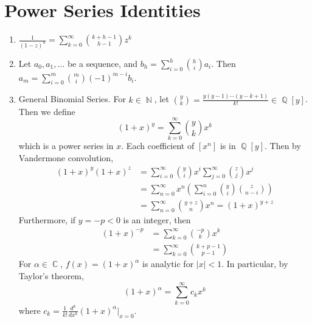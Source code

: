 \documentclass[11pt, a4paper]{memoir}
\DeclareMathOperator{\N}{{\mathbb{N}}}
\DeclareMathOperator{\Q}{{\mathbb{Q}}}
\DeclareMathOperator{\C}{{\mathbb{C}}}
\theoremstyle{change}
\theoremstyle{plain}
\theoremstyle{nonumberplain}
\numberwithin{equation}{section}
\begin{document}
\chapter{Power Series Identities}
\begin{enumerate}[nl,r]
    \item $\displaystyle\frac{1}{(1-z)^h}=\sum_{k=0}^\infty\binom{k+h-1}{h-1}z^k$
    \item Let $a_0,a_1,\ldots$ be a sequence, and $b_h=\sum_{i=0}^h\binom{h}{i}a_i$.
        Then $a_m=\sum_{i=0}^m\binom{m}{i}(-1)^{m-i}b_i$.
    \item General Binomial Series.
        For $k\in\N$, let $\binom{y}{k}=\frac{y(y-1)\cdots(y-k+1)}{k!}\in\Q[y]$.
        Then we define
        \begin{equation*}
            (1+x)^y=\sum_{k=0}^\infty\binom{y}{k}x^k
        \end{equation*}
        which is a power series in $x$.
        Each coefficient of $[x^n]$ is in $\Q[y]$.
        Then by Vandermone convolution,
        \begin{align*}
            (1+x)^y(1+x)^z&=\sum_{i=0}^\infty\binom{y}{i}x^i\sum_{j=0}^\infty\binom{z}{j}x^j\\
                          &=\sum_{n=0}^\infty x^n\left(\sum_{i=0}^n\binom{y}{i}\binom{z}{n-i}\right)\\
                          &= \sum_{n=0}^\infty\binom{y+z}{n}x^n=(1+x)^{y+z}
        \end{align*}
        Furthermore, if $y=-p<0$ is an integer, then
        \begin{align*}
            (1+x)^{-p}&=\sum_{k=0}^\infty\binom{-p}{k}x^k\\
                      &=\sum_{k=0}^\infty\binom{k+p-1}{p-1}
        \end{align*}
        For $\alpha\in\C$, $f(x)=(1+x)^\alpha$ is analytic for $|x|<1$.
        In particular, by Taylor's theorem,
        \begin{equation*}
            (1+x)^\alpha=\sum_{k=0}^\infty c_kx^k
        \end{equation*}
        where $c_k=\frac{1}{k!}\frac{d^k}{dx^k}(1+x)^\alpha|_{x=0}$.
\end{enumerate}
\end{document}
